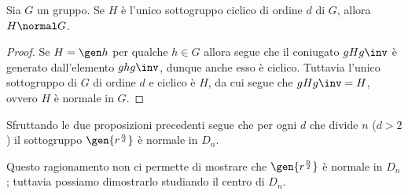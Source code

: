 \begin{corollary}
    Sia $G$ un gruppo. Se $H$ è l'unico sottogruppo ciclico di ordine $d$ di $G$, allora $H \normal G$.
\end{corollary}
\begin{proof}
    Se $H = \gen h$ per qualche $h \in G$ allora segue che il coniugato $gHg\inv$ è generato dall'elemento $ghg\inv$, dunque anche esso è ciclico. Tuttavia l'unico sottogruppo di $G$ di ordine $d$ e ciclico è $H$, da cui segue che $gHg\inv = H$, ovvero $H$ è normale in $G$.
\end{proof}

Sfruttando le due proposizioni precedenti segue che per ogni $d$ che divide $n$ ($d > 2$) il sottogruppo $\gen{r^{\frac{n}{d}}}$ è normale in $D_n$.

Questo ragionamento non ci permette di mostrare che $\gen{r^{\frac{n}2}}$ è normale in $D_n$; tuttavia possiamo dimostrarlo studiando il centro di $D_n$.

